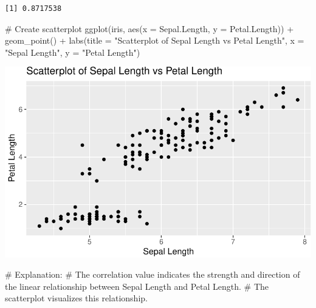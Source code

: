 \documentclass[
  letterpaper,
  DIV=11,
  numbers=noendperiod]{scrreprt}
\newenvironment{Shaded}{\begin{snugshade}}{\end{snugshade}}
\newcommand{\AttributeTok}[1]{\textcolor[rgb]{0.40,0.45,0.13}{#1}}
\newcommand{\CommentTok}[1]{\textcolor[rgb]{0.37,0.37,0.37}{#1}}
\newcommand{\FunctionTok}[1]{\textcolor[rgb]{0.28,0.35,0.67}{#1}}
\newcommand{\NormalTok}[1]{\textcolor[rgb]{0.00,0.23,0.31}{#1}}
\newcommand{\OtherTok}[1]{\textcolor[rgb]{0.00,0.23,0.31}{#1}}
\newcommand{\SpecialCharTok}[1]{\textcolor[rgb]{0.37,0.37,0.37}{#1}}
\newcommand{\StringTok}[1]{\textcolor[rgb]{0.13,0.47,0.30}{#1}}
\begin{document}
\begin{Shaded}
\end{Shaded}

\begin{verbatim}
[1] 0.8717538
\end{verbatim}

\begin{Shaded}
\begin{Highlighting}[]
\CommentTok{\# Create scatterplot}
\FunctionTok{ggplot}\NormalTok{(iris, }\FunctionTok{aes}\NormalTok{(}\AttributeTok{x =}\NormalTok{ Sepal.Length, }\AttributeTok{y =}\NormalTok{ Petal.Length)) }\SpecialCharTok{+}
  \FunctionTok{geom\_point}\NormalTok{() }\SpecialCharTok{+}
  \FunctionTok{labs}\NormalTok{(}\AttributeTok{title =} \StringTok{"Scatterplot of Sepal Length vs Petal Length"}\NormalTok{, }\AttributeTok{x =} \StringTok{"Sepal Length"}\NormalTok{, }\AttributeTok{y =} \StringTok{"Petal Length"}\NormalTok{)}
\end{Highlighting}
\end{Shaded}

\includegraphics{Scatterplots_and_Correlation_files/figure-pdf/unnamed-chunk-6-1.pdf}

\begin{Shaded}
\begin{Highlighting}[]
\CommentTok{\# Explanation:}
\CommentTok{\# The correlation value indicates the strength and direction of the linear relationship between Sepal Length and Petal Length.}
\CommentTok{\# The scatterplot visualizes this relationship.}
\end{Highlighting}
\end{Shaded}
\end{document}
